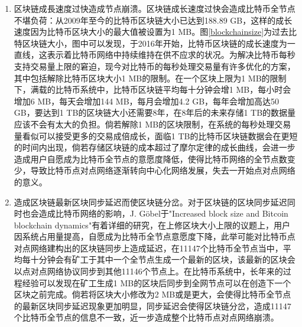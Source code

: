 					\begin{enumerate}
						\item 区块链成⾧速度过快造成节点崩溃。区块链成长速度过快会造成比特币全节点不堪负荷：从2009年至今的比特币区块链大小已达到188.89 GB，这样的成长速度因为比特币区块大小的最大值被设置为1 MB。图\ref{blockchainsize}为过去比特区块链大小，图中可以发现，于2016年开始，比特币区块链的成长速度为一直线，这表示着比特币网络中持续维持在供不应求的状况。为解决比特币每秒⽀持交易量上限的窘迫，现今对⽐特币的每秒处理交易量有许多优化的⽅案，其中包括解除比特币区块大小1 MB的限制。在一个区块上限为1 MB的限制下，满载的比特币系统中，比特币区块链平均每十分钟会增1 MB，每小时会增加6 MB，每天会增加144 MB，每月会增加4.2 GB，每年会增加高达50 GB，要达到1 TB的区块链大小还需要8年，在8年后的未来存储1 TB的数据量应该不会有太大的负担。倘若解除1 MB的区块限制，在系统的每秒处理交易量看似可以接受更多的交易成倍成长，面临1 TB的比特币区块链数据会在更短的时间内出现，倘若存储区块链的成本超过了摩尔定律的成长曲线，会进一步造成用户自愿成为比特币全节点的意愿度降低，使得比特币网络的全节点数变少，导致比特币点对点网络逐渐转向中心化网络发展，失去一开始点对点网络的意义。

						\item 造成区块链最新区块同步延迟而使区块链分岔。对于区块链的区块同步延迟同时也会造成比特币网络的影响，J. Göbel于"Increased block size and Bitcoin blockchain dynamics"\supercite{TelecommunicationNetworksandApplicationsConferenceITNAC201727thInternational}有着详细的研究，在上修区块大小上限的议题上，用户因系统占用量提高，⾃愿成为⽐特币全节点意愿度下降，此举可能对⽐特币点对点网络建构出的区块链同步上造成延迟，在11147个比特币全节点当中，平均每十分钟会有矿工于其中一个全节点生成一个最新的区块，该最新的区块会以点对点网络协议同步到其他11146个节点上。在比特币系统中，长年来的过程经验可以发现在矿工生成1 MB的区块后同步到全网节点可以在创造下一个区块之前完成。倘若将区块大小修改为2 MB或是更大，会使得比特币全节点的最新区块同步延迟现象更加明显，同步延迟会使得区块链分岔，造成11147个比特币全节点的信息不一致，近一步造成整个比特币点对点网络崩溃。
					\end{enumerate}
					

